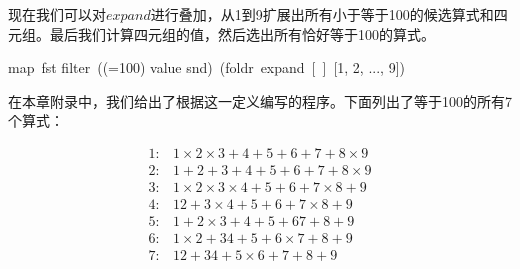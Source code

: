 \documentclass[b5paper]{ctexart}
\begin{document}
现在我们可以对$expand$进行叠加，从1到9扩展出所有小于等于100的候选算式和四元组。最后我们计算四元组的值，然后选出所有恰好等于100的算式。

\be
map\ fst \circ filter\ ((=100) \circ value \circ snd)\ (foldr\ expand\ [\ ]\ [1, 2, ..., 9])
\ee

在本章附录中，我们给出了根据这一定义编写的程序。下面列出了等于100的所有7个算式：

\[
\begin{array}{rl}
1: & 1 \times 2 \times 3 + 4 + 5 + 6 + 7 + 8 \times 9 \\
2: & 1 + 2 + 3 + 4 + 5 + 6 + 7 + 8 \times 9 \\
3: & 1 \times 2 \times 3 \times 4 + 5 + 6 + 7 \times 8 + 9 \\
4: & 12 + 3 \times 4 + 5 + 6 + 7 \times 8 + 9 \\
5: & 1 + 2 \times 3 + 4 + 5 + 67 + 8 + 9 \\
6: & 1 \times 2 + 34 + 5 + 6 \times 7 + 8 + 9 \\
7: & 12 + 34 + 5 \times 6 + 7 + 8 + 9 \\
\end{array}
\]

\begin{Exercise}\label{ex:make-centry}
\end{Exercise}
\end{document}
